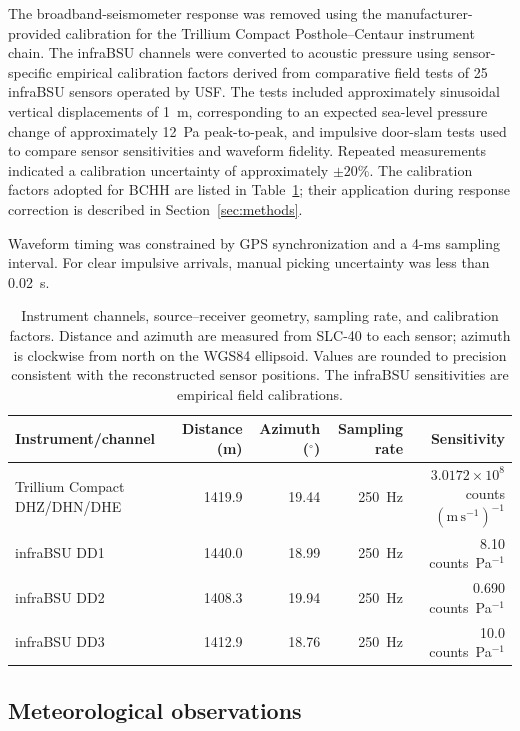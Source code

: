 \documentclass[]{seismica}
\begin{document}
The broadband-seismometer response was removed using the manufacturer-provided
calibration for the Trillium Compact Posthole--Centaur instrument chain.
The infraBSU channels were converted to acoustic pressure using
sensor-specific empirical calibration factors derived from comparative field
tests of 25 infraBSU sensors operated by USF. The tests included approximately
sinusoidal vertical displacements of 1~m, corresponding to an expected
sea-level pressure change of approximately 12~Pa peak-to-peak, and impulsive
door-slam tests used to compare sensor sensitivities and waveform fidelity.
Repeated measurements indicated a calibration uncertainty of approximately
$\pm20\%$. The calibration factors adopted for BCHH are listed in
Table~\ref{tab:instrument_calibration}; their application during response
correction is described in Section~\ref{sec:methods}.

Waveform timing was constrained by GPS synchronization and a 4-ms sampling
interval. For clear impulsive arrivals, manual picking uncertainty was less
than 0.02~s.

\begin{table}[t]
\centering
\caption{Instrument channels, source--receiver geometry, sampling rate, and
calibration factors. Distance and azimuth are measured from SLC-40 to each
sensor; azimuth is clockwise from north on the WGS84 ellipsoid. Values are
rounded to precision consistent with the reconstructed sensor positions. The
infraBSU sensitivities are empirical field calibrations.}
\label{tab:instrument_calibration}
\begin{tabular}{lrrrr}
\hline
Instrument/channel & Distance (m) & Azimuth ($^\circ$) & Sampling rate & Sensitivity \\
\hline
Trillium Compact DHZ/DHN/DHE
  & 1419.9 & 19.44 & 250~Hz
  & $3.0172\times10^8$ counts $(\mathrm{m\,s^{-1}})^{-1}$ \\
infraBSU DD1
  & 1440.0 & 18.99 & 250~Hz
  & 8.10 counts~Pa$^{-1}$ \\
infraBSU DD2
  & 1408.3 & 19.94 & 250~Hz
  & 0.690 counts~Pa$^{-1}$ \\
infraBSU DD3
  & 1412.9 & 18.76 & 250~Hz
  & 10.0 counts~Pa$^{-1}$ \\
\hline
\end{tabular}
\end{table}


\subsection{Meteorological observations}
\end{document}

